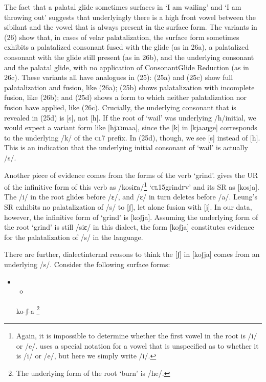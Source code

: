 The fact that a palatal glide sometimes surfaces in ‘I am wailing’ and ‘I am throwing out’ suggests that underlyingly there is a high front vowel between the sibilant and the vowel that is always present in the surface form. The variants in (26) show that, in cases of velar palatalization, the surface form sometimes exhibits a palatalized consonant fused with the glide (as in 26a), a palatalized consonant with the glide still present (as in 26b), and the underlying consonant and the palatal glide, with no application of ConsonantGlide Reduction (as in 26c). These variants all have analogues in (25): (25a) and (25c) show full palatalization and fusion, like (26a); (25b) shows palatalization with incomplete fusion, like (26b); and (25d) shows a form to which neither palatalization nor fusion have applied, like (26c). Crucially, the underlying consonant that is revealed in (25d) is [s], not [h]. If the root of ‘wail’ was underlying /h/initial, we would expect a variant form like [hjɔɔmaa], since the [k] in [kjaaŋge] corresponds to the underlying /k/ of the \textsc{cl}7 prefix. In (25d), though, we see [s] instead of [h]. This is an indication that the underlying initial consonant of ‘wail’ is actually /s/. 

Another piece of evidence comes from the forms of the verb ‘grind’. \citet{Leung1991} gives the UR of the infinitive form of this verb as /kosiɛa/\footnote{   Again, it is impossible to determine whether the first vowel in the root is /i/ or /e/. \citet{Leung1991} uses a special notation for a vowel that is unspecified as to whether it is /i/ or /e/, but here we simply write /i/. } ‘\textsc{cl}15grind\textsc{fv}’ and its SR as [kosja]. The /i/ in the root glides before /ɛ/, and /ɛ/ in turn deletes before /a/. Leung’s SR exhibits no palatalization of /s/ to [ʃ], let alone fusion with [j]. In our data, however, the infinitive form of ‘grind’ is [koʃja]. Assuming the underlying form of the root ‘grind’ is still /siɛ/ in this dialect, the form [koʃja] constitutes evidence for the palatalization of /s/ in the language. 

There are further, dialectinternal reasons to think the [ʃ] in [koʃja] comes from an underlying /s/. Consider the following surface forms:

\setcounter{itemize}{0}
\begin{itemize}
\item \setcounter{itemize}{0}
\begin{itemize}
\item \end{itemize}
\end{itemize}
\setcounter{itemize}{0}
\begin{itemize}
\item [ko-ʃ{}-a]\footnote{   The underlying form of the root ‘burn’ is /he/. }

\end{itemize}

